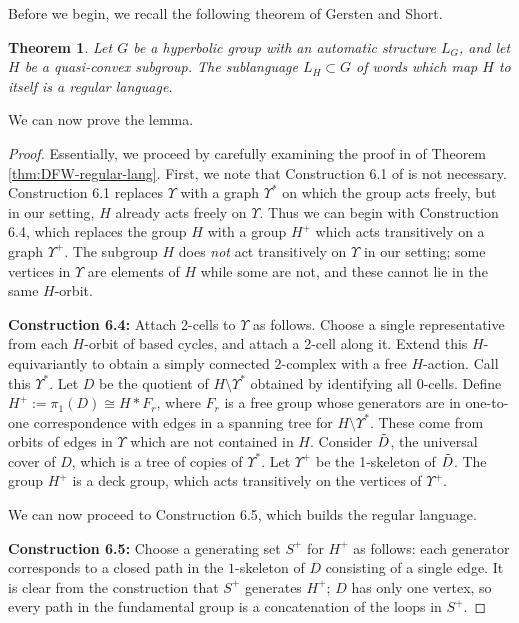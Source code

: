 \documentclass[11pt,letterpaper]{amsart}
\newtheorem{theorem}{Theorem}[section]
\theoremstyle{definition}
\theoremstyle{plain}
\theoremstyle{TheoremNum}
\begin{document}
    Before we begin, we recall the following theorem of Gersten and Short.
    \begin{theorem}\cite[Theorem~2.2]{Gersten-Short}
        Let $G$ be a hyperbolic group with an automatic structure $L_G$, and let $H$ be a quasi-convex subgroup. The sublanguage $L_H \subset G$ of words which map $H$ to itself is a regular language.
    \end{theorem}
    We can now prove the lemma.
    \begin{proof}
        Essentially, we proceed by carefully examining the proof in \cite{DFW} of Theorem \ref{thm:DFW-regular-lang}. First, we note that Construction 6.1 of \cite{DFW} is not necessary. Construction 6.1 replaces $\Upsilon$ with a graph $\Upsilon^{*}$ on which the group acts freely, but in our setting, $H$ already acts freely on $\Upsilon$. Thus we can begin with Construction 6.4, which replaces the group $H$ with a group $H^{+}$ which acts transitively on a graph $\Upsilon^{+}$. The subgroup $H$ does \emph{not} act transitively on $\Upsilon$ in our setting; some vertices in $\Upsilon$ are elements of $H$ while some are not, and these cannot lie in the same $H$-orbit.

        \textbf{Construction 6.4:} Attach 2-cells to $\Upsilon$ as follows. Choose a single representative from each $H$-orbit of based cycles, and attach a 2-cell along it. Extend this $H$-equivariantly to obtain a simply connected 2-complex with a free $H$-action. Call this $\Upsilon^{*}$. Let $D$ be the quotient of $H \setminus \Upsilon^{*}$ obtained by identifying all 0-cells. Define $H^{+} := \pi_1(D) \cong H * F_r$, where $F_r$ is a free group whose generators are in one-to-one correspondence with edges in a spanning tree for $H \setminus \Upsilon^{*}$. These come from orbits of edges in $\Upsilon$ which are not contained in $H$. Consider $\Tilde{D}$, the universal cover of $D$, which is a tree of copies of $\Upsilon^{*}$. Let $\Upsilon^{+}$ be the 1-skeleton of $\Tilde{D}$. The group $H^{+}$ is a deck group, which acts transitively on the vertices of $\Upsilon^{+}$.

        We can now proceed to Construction 6.5, which builds the regular language. 

        \textbf{Construction 6.5:} Choose a generating set $S^{+}$ for $H^{+}$ as follows: each generator corresponds to a closed path in the $1$-skeleton of $D$ consisting of a single edge. It is clear from the construction that $S^{+}$ generates $H^{+}$; $D$ has only one vertex, so every path in the fundamental group is a concatenation of the loops in $S^{+}$.
        

\end{proof}
\end{document}
